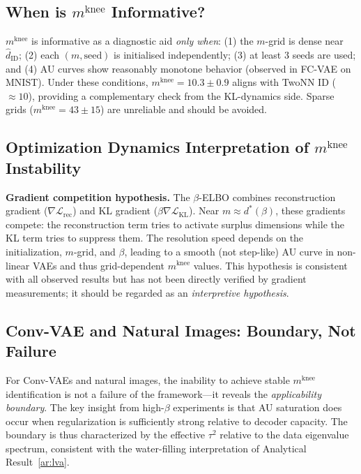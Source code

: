 \documentclass[make,article,submit,pdftex,moreauthors]{Definitions/mdpi}
\newcommand{\mknee}{m^{\mathrm{knee}}}
\newcommand{\hatdID}{\hat{d}_{\mathrm{ID}}}
\begin{document}
\subsection{\texorpdfstring{When is $\mknee$ Informative?}{When is m\_knee Informative?}}\label{sec:disc_mknee}

$\mknee$ is informative as a diagnostic aid \emph{only when}:
(1) the $m$-grid is dense near $\hatdID$; (2) each $(m,\text{seed})$ is
initialised independently; (3) at least 3 seeds are used; and
(4) AU curves show reasonably monotone behavior (observed in FC-VAE on MNIST).
Under these conditions, $\mknee=10.3\pm0.9$ aligns with TwoNN ID ($\approx10$),
providing a complementary check from the KL-dynamics side.
Sparse grids ($\mknee=43\pm15$) are unreliable and should be avoided.

\subsection{\texorpdfstring{Optimization Dynamics Interpretation of $\mknee$ Instability}{Optimization Dynamics Interpretation of m\_knee Instability}}
\label{sec:disc_grad}

\textbf{Gradient competition hypothesis.}
The $\beta$-ELBO combines reconstruction gradient ($\nabla\mathcal{L}_{\mathrm{rec}}$)
and KL gradient ($\beta\nabla\mathcal{L}_{\mathrm{KL}}$).
Near $m\approx d^*(\beta)$, these gradients compete: the reconstruction term
tries to activate surplus dimensions while the KL term tries to suppress them.
The resolution speed depends on the initialization, $m$-grid, and $\beta$,
leading to a smooth (not step-like) AU curve in non-linear VAEs and thus
grid-dependent $\mknee$ values.
This hypothesis is consistent with all observed results but has not been
directly verified by gradient measurements; it should be regarded as an
\emph{interpretive hypothesis}.

\subsection{Conv-VAE and Natural Images: Boundary, Not Failure}\label{sec:disc_boundary}

For Conv-VAEs and natural images, the inability to achieve stable $\mknee$
identification is not a failure of the framework---it reveals the
\emph{applicability boundary}.
The key insight from high-$\beta$ experiments is that AU saturation does occur
when regularization is sufficiently strong relative to decoder capacity.
The boundary is thus characterized by the effective $\tau^2$ relative to the
data eigenvalue spectrum, consistent with the water-filling interpretation of
Analytical Result~\ref{ar:lva}.
\end{document}
